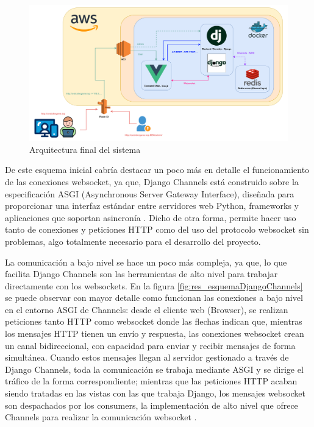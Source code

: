 \begin{figure}[h]
	\centering
	\includegraphics[width=\textwidth,clip=true]{res_arquitecturaSoftware.pdf}
	\caption{Arquitectura final del sistema}
	\label{fig:res_arquitecturaSoftware}
\end{figure}

De este esquema inicial cabría destacar un poco más en detalle el funcionamiento de las conexiones websocket, ya que, Django Channels 
está construido sobre la especificación ASGI (Asynchronous Server Gateway Interface), diseñada para proporcionar una interfaz estándar entre servidores web Python, frameworks y aplicaciones que soportan asincronía \cite{ASGI}. Dicho de otra forma,
permite hacer uso tanto de conexiones y peticiones HTTP como del uso del protocolo websocket sin problemas, algo totalmente necesario para el desarrollo del proyecto. 

La comunicación a bajo nivel se hace un poco más compleja, ya que, lo que facilita Django Channels son las herramientas de alto
nivel para trabajar directamente con los websockets. En la figura \ref{fig:res_esquemaDjangoChannels} se puede observar con mayor detalle como funcionan
las conexiones a bajo nivel en el entorno ASGI de Channels: desde el cliente web (Browser), se realizan peticiones
tanto HTTP como websocket donde las flechas indican que, mientras los mensajes HTTP tienen un envío y respuesta, las conexiones websocket crean 
un canal bidireccional, con capacidad para enviar y recibir mensajes de forma simultánea. Cuando estos mensajes llegan al servidor gestionado
a través de Django Channels, toda la comunicación se trabaja mediante ASGI y se dirige el tráfico de la forma correspondiente; mientras que las peticiones HTTP
acaban siendo tratadas en las vistas con las que trabaja Django, los mensajes websocket son despachados por los consumers, la implementación de 
alto nivel que ofrece Channels para realizar la comunicación websocket \cite{websocketMDN} \cite{whatIsDjangoChannels}.

